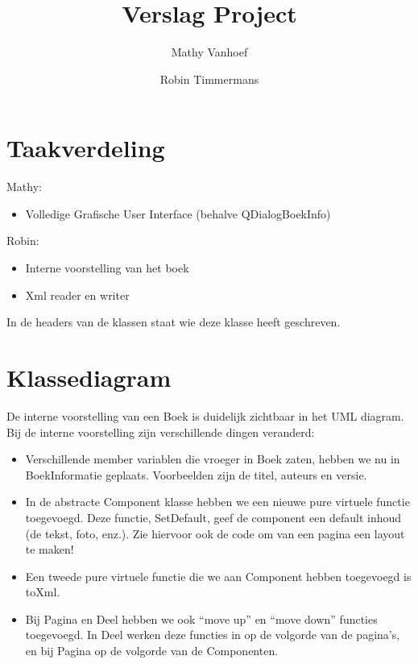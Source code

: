 \documentclass[a4paper,11pt]{article}
\title{Verslag Project}
\author{Mathy Vanhoef \and Robin Timmermans}
\begin{document}
\maketitle

\section{Taakverdeling}

Mathy:

\begin{itemize}
\item Volledige Grafische User Interface (behalve QDialogBoekInfo)
\end{itemize}

\noindent Robin:

\begin{itemize}
\item Interne voorstelling van het boek
\item Xml reader en writer
\end{itemize}

\noindent In de headers van de klassen staat wie deze klasse heeft geschreven.

\section{Klassediagram}

De interne voorstelling van een Boek is duidelijk zichtbaar in het UML diagram. Bij de interne voorstelling zijn verschillende
dingen veranderd:

\begin{itemize}
\item Verschillende member variablen die vroeger in Boek zaten, hebben we nu in BoekInformatie geplaats. Voorbeelden
zijn de titel, auteurs en versie.
\item In de abstracte Component klasse hebben we een nieuwe pure virtuele functie toegevoegd. Deze functie, SetDefault,
geef de component een default inhoud (de tekst, foto, enz.). Zie hiervoor ook de code om van een pagina een layout te maken!
\item Een tweede pure virtuele functie die we aan Component hebben toegevoegd is toXml.
\item Bij Pagina en Deel hebben we ook ``move up'' en ``move down'' functies toegevoegd. In Deel werken deze functies in
op de volgorde van de pagina's, en bij Pagina op de volgorde van de Componenten.
\end{itemize}
\end{document}
